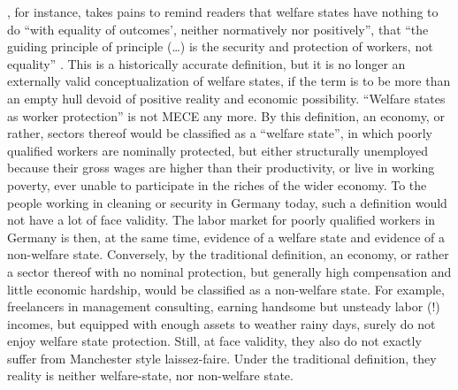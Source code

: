 \begin{enumerate}
	\citeauthor{Offe2003}, for instance, takes pains to remind readers that welfare states have nothing to do ``with equality of outcomes', neither normatively nor positively'', that ``the guiding principle of principle (\ldots) is the security and protection of workers, not equality'' \citeyearpar[450]{Offe2003}.
This is a historically accurate definition, but it is no longer an externally valid conceptualization of welfare states, if the term is to be more than an empty hull devoid of positive reality and economic possibility.
``Welfare states as worker protection'' is not \gls{MECE} any more.
By this definition, an economy, or rather, sectors thereof would be classified as a ``welfare state'', in which poorly qualified workers are nominally protected, but either structurally unemployed because their gross wages are higher than their productivity, or live in working poverty, ever unable to participate in the riches of the wider economy.
To the people working in cleaning or security in Germany today, such a definition would not have a lot of face validity.
The labor market for poorly qualified workers in Germany is then, at the same time, evidence of a welfare state and evidence of a non-welfare state.
Conversely, by the traditional definition, an economy, or rather a sector thereof with no nominal protection, but generally high compensation and little economic hardship, would be classified as a non-welfare state.
For example, freelancers in management consulting, earning handsome but unsteady labor (!) incomes, but equipped with enough assets to weather rainy days, surely do not enjoy welfare state protection.
Still, at face validity, they also do not exactly suffer from Manchester style laissez-faire.
Under the traditional definition, they reality is neither welfare-state, nor non-welfare state.


\end{enumerate}
